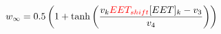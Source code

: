 \documentclass[fleqn]{report}
\numberwithin{equation}{section}
\numberwithin{equation}{section}
\newcommand{\microM}{\textmu M}
\begin{document}
		\begin{equation} \label{eq:winf}
		w_{\infty}=0.5 \left(1+\mathrm{tanh}\left(\frac{v_{k}\textcolor{red}{EET_{shift}}[EET]_{k}-v_{3} }{v_{4}} \right)  \right) 
		\end{equation}
%
%	
%	
%							
%							
%	
\end{document}
